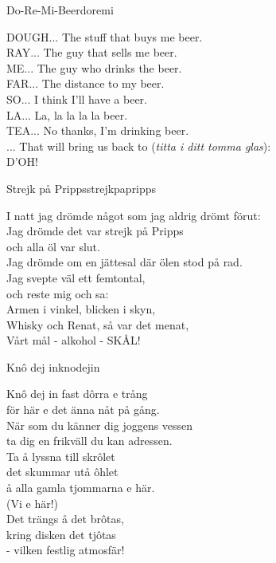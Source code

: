 \begin{song}{Do-Re-Mi-Beer}{doremi}
\begin{vers}
DOUGH... The stuff that buys me beer.\\
RAY... The guy that sells me beer.\\
ME... The guy who drinks the beer.\\
FAR... The distance to my beer.\\
SO... I think I'll have a beer.\\
LA... La, la la la la beer.\\
TEA... No thanks, I'm drinking beer.\\
... That will bring us back to (\textit{titta i ditt tomma glas}):\\
D'OH! \\
\end{vers}
\end{song}

\newpage

\begin{song}{Strejk på Pripps}{strejkpapripps}
\begin{vers}
I natt jag drömde något som jag aldrig drömt förut:\\
Jag drömde det var strejk på Pripps\\
och alla öl var slut.\\
Jag drömde om en jättesal där ölen stod på rad.\\
Jag svepte väl ett femtontal,\\
och reste mig och sa:\\
Armen i vinkel, blicken i skyn,\\
Whisky och Renat, så var det menat,\\
Vårt mål - alkohol - SKÅL!\\
\end{vers}
\end{song}


\begin{song}{Knô dej in}{knodejin}
\begin{vers}
Knô dej in fast dôrra e trång\\
för här e det änna nåt på gång.\\
När som du känner dig joggens vessen\\
ta dig en frikväll du kan adressen.\\
Ta å lyssna till skrôlet\\
det skummar utå ôhlet\\
å alla gamla tjommarna e här.\\
(Vi e här!)\\
Det trängs å det brôtas,\\
kring disken det tjôtas\\
- vilken festlig atmosfär!\\
\end{vers}
\end{song}


